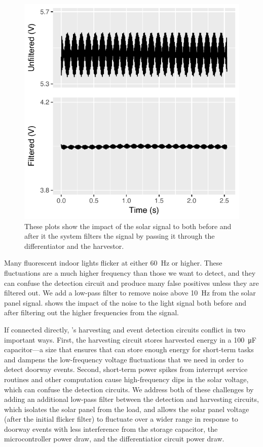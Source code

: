 \begin{figure}[t]
\centering
\includegraphics[width=\columnwidth]{figs/flicker.pdf}
\caption{These plots show the impact of the solar signal to \sysname both before and after it the system filters the signal by passing it through the differentiator and the harvestor.  \label{fig:flicker}}
\end{figure}


Many fluorescent indoor lights flicker at either \SI{60}{\hertz} or higher.
These fluctuations are a much higher frequency than those we want to detect, and they can confuse the detection circuit and produce many false positives unless they are filtered out.
We add a low-pass filter to remove noise above \SI{10}{\hertz} from the solar panel signal.   shows the impact of the noise to the light signal both before and after filtering out the higher frequencies from the signal.

If connected directly, \sysname's harvesting and event detection circuits conflict in two important ways.
First, the harvesting circuit stores harvested energy in a \SI{100}{\micro\farad} capacitor---a size that ensures that \sysname can store enough energy for short-term tasks and dampens the low-frequency voltage fluctuations that we need in order to detect doorway events.
Second, short-term power spikes from interrupt service routines and other computation cause high-frequency dips in the solar voltage, which can confuse the detection circuits.
We address both of these challenges by adding an additional low-pass filter between the detection and harvesting circuits, which isolates the solar panel from the load, and allows the solar panel voltage (after the initial flicker filter) to fluctuate over a wider range in response to doorway events with less interference from the storage capacitor, the microcontroller power draw, and the differentiatior circuit power draw.

